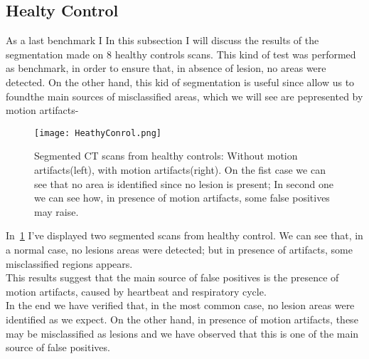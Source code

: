 
	\subsection{Healty Control}
	
	As a last benchmark I
	In this subsection I will discuss the results of the segmentation made on $8$ healthy controls scans. This kind of  test was performed as benchmark, in order to ensure that, in absence of lesion, no areas were detected. On the other hand, this kid of segmentation is useful since allow us to foundthe main sources of misclassified areas, which we will see are pepresented by motion artifacts-
	
	\begin{figure}[h!]
		\centering
			\texttt{[image: HeathyConrol.png]}
			\caption{Segmented CT scans from healthy controls: Without motion artifacts(left), with motion artifacts(right). On the fist case we can see that no area is identified since no lesion is present; In second one we can see how, in presence of motion artifacts, some false positives may raise.  }\label{fig:HealthyControl}
	\end{figure}

	In \figurename\,\ref{fig:HealthyControl} I've displayed two segmented scans from healthy control. We can see that, in a normal case, no lesions areas were detected; but in presence of artifacts, some misclassified regions appears.\\
	This results suggest that the main source of false positives is the presence of motion artifacts, caused by heartbeat and respiratory cycle.\\
	
	In the end we have verified that, in the most common case, no lesion areas were identified as we expect. On the other hand, in presence of motion artifacts, these may be misclassified as lesions and we have observed that this is one of the main source of false positives. 
	
	
	

